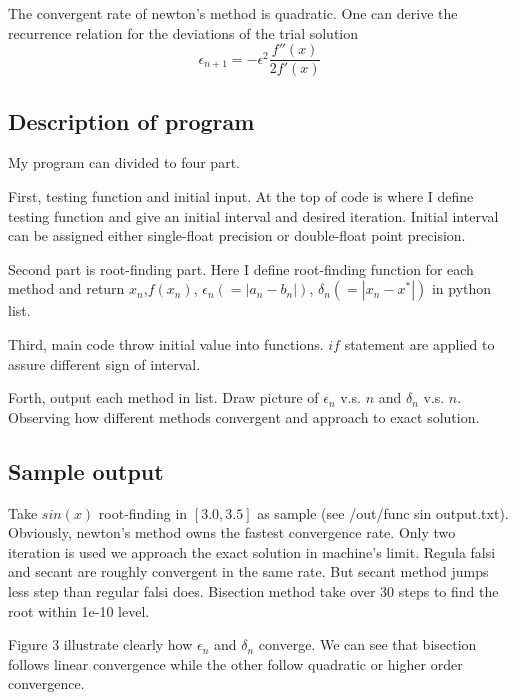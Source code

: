 \documentclass[12pt]{article}
\begin{document}
The convergent rate of newton's method is quadratic. One can derive the recurrence relation for the deviations of the trial solution
\begin{equation}
\epsilon_{n+1}=-\epsilon^{2}\frac{f''(x)}{2f'(x)}
\end{equation}

\subsection{Description of program}
My program can divided to four part.

First, testing function and initial input. At the top of code is where I define testing function and give an initial interval and desired iteration. Initial interval can be assigned either single-float precision or double-float point precision.

Second part is root-finding part. Here I define root-finding function for each method and return $x_{n}$,$f(x_{n})$, $\epsilon_{n}(=|a_{n}-b_{n}|)$, $\delta_{n}(=|x_{n}-x^*|)$ in python list.

Third, main code throw initial value into functions. $if$ statement are applied to assure different sign of interval.

Forth, output each method in list. Draw picture of $\epsilon_{n}$ v.s. $n$ and $\delta_{n}$ v.s. $n$. Observing how different methods convergent and approach to exact solution.

\subsection{Sample output}
Take $sin(x)$ root-finding in $[3.0,3.5]$ as sample (see /out/func sin output.txt). 
Obviously, newton's method owns the fastest convergence rate. Only two iteration is used we approach the exact solution in machine's limit.
Regula falsi and secant are roughly convergent in the same rate. But secant method jumps less step than regular falsi does. Bisection method take over 30 steps to find the root within 1e-10 level.

Figure 3 illustrate clearly how $\epsilon_{n}$ and $\delta_{n}$ converge. We can see that bisection follows linear convergence while the other follow quadratic or higher order convergence. 
\end{document}

